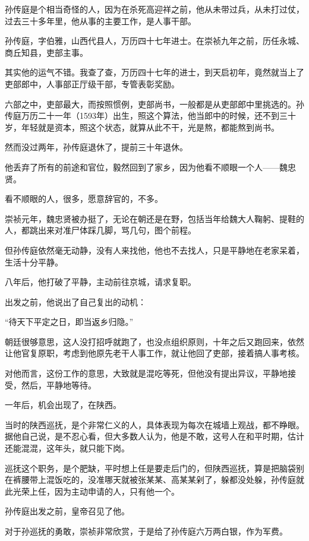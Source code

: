 	\begin{multicols}{\theparacolNo}
\fi
孙传庭是个相当奇怪的人，因为在杀死高迎祥之前，他从未带过兵，从未打过仗，过去三十多年里，他从事的主要工作，是人事干部。

孙传庭，字伯雅，山西代县人，万历四十七年进士。在崇祯九年之前，历任永城、商丘知县，吏部主事。

其实他的运气不错。我查了查，万历四十七年的进士，到天启初年，竟然就当上了吏部郎中，人事部正厅级干部，专管表彰奖励。

六部之中，吏部最大，而按照惯例，吏部尚书，一般都是从吏部郎中里挑选的。孙传庭万历二十一年（1593年）出生，照这个算法，他当郎中的时候，还不到三十岁，年轻就是资本，照这个状态，就算从此不干，光是熬，都能熬到尚书。

然而没过两年，孙传庭退休了，提前三十年退休。

他丢弃了所有的前途和官位，毅然回到了家乡，因为他看不顺眼一个人——魏忠贤。

看不顺眼的人，很多，愿意辞官的，不多。

崇祯元年，魏忠贤被办挺了，无论在朝还是在野，包括当年给魏大人鞠躬、提鞋的人，都跳出来对准尸体踩几脚，骂几句，图个前程。

但孙传庭依然毫无动静，没有人来找他，他也不去找人，只是平静地在老家呆着，生活十分平静。

八年后，他打破了平静，主动前往京城，请求复职。

出发之前，他说出了自己复出的动机：

“待天下平定之日，即当返乡归隐。”

朝廷很够意思，这人没打招呼就跑了，也没点组织原则，十年之后又跑回来，依然让他官复原职，考虑到他原先老干人事工作，就让他回了吏部，接着搞人事考核。

对他而言，这份工作的意思，大致就是混吃等死，但他没有提出异议，平静地接受，然后，平静地等待。

一年后，机会出现了，在陕西。

当时的陕西巡抚，是个非常仁义的人，具体表现为每次在城墙上观战，都不睁眼。据他自己说，是不忍心看，但大多数人认为，他是不敢，这号人在和平时期，估计还能混混，这年头，就只能下岗。

巡抚这个职务，是个肥缺，平时想上任是要走后门的，但陕西巡抚，算是把脑袋别在裤腰带上混饭吃的，没准哪天就被张某某、高某某剁了，躲都没处躲，孙传庭就此光荣上任，因为主动申请的人，只有他一个。

孙传庭出发之前，皇帝召见了他。

对于孙巡抚的勇敢，崇祯非常欣赏，于是给了孙传庭六万两白银，作为军费。


\end{multicols}
